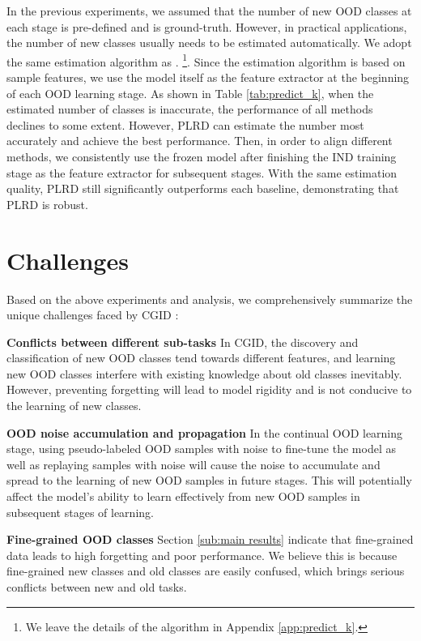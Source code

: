 \documentclass[11pt]{article}
\begin{document}
In the previous experiments, we assumed that the number of new OOD classes at each stage is pre-defined and is ground-truth. However, in practical applications, the number of new classes usually needs to be estimated automatically. We adopt the same estimation algorithm as \citet{zhang2021discovering,mou-etal-2022-generalized}. 
\footnote{We leave the details of the algorithm in Appendix \ref{app:predict_k}.}.
Since the estimation algorithm is based on sample features, we use the model itself as the feature extractor at the beginning of each OOD learning stage. As shown in Table \ref{tab:predict_k}, when the estimated number of classes is inaccurate, the performance of all methods declines to some extent. However, PLRD can estimate the number most accurately and achieve the best performance. Then, in order to align different methods, we consistently use the frozen model after finishing the IND training stage as the feature extractor for subsequent stages. With the same estimation quality, PLRD still significantly outperforms each baseline, demonstrating that PLRD is robust.

\section{Challenges}
\label{sec:challenge}
Based on the above experiments and analysis, we comprehensively summarize the unique challenges faced by CGID :

\textbf{Conflicts between different sub-tasks} In CGID, the discovery and classification of new OOD classes tend towards different features, and learning new OOD classes interfere with existing knowledge about old classes inevitably. However, preventing forgetting will lead to model rigidity and is not conducive to the learning of new classes.

\textbf{OOD noise accumulation and propagation} In the continual OOD learning stage, using pseudo-labeled OOD samples with noise to fine-tune the model as well as replaying samples with noise will cause the noise to accumulate and spread to the learning of new OOD samples in future stages. This will potentially affect the model's ability to learn effectively from new OOD samples in subsequent stages of learning. 

\textbf{Fine-grained OOD classes} Section \ref{sub:main results} indicate that fine-grained data leads to high forgetting and poor performance. We believe this is because fine-grained new classes and old classes are easily confused, which brings serious conflicts between new and old tasks.
\end{document}
